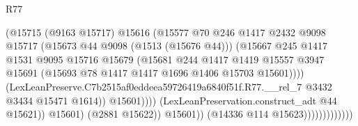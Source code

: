 \begin{lexlean}{R77}
\begin{coremodule}
{{                                              (@15715
                                                (@9163 @15717)
                                                @15616
                                                (@15577
                                                  @70
                                                  @246
                                                  @1417
                                                  @2432
                                                  @9098
                                                  @15717
                                                  (@15673 @44 @9098 (@1513 (@15676 @44)))
                                                  (@15667
                                                    @245
                                                    @1417
                                                    @1531
                                                    @9095
                                                    @15716
                                                    @15679
                                                    (@15681
                                                      @244
                                                      @1417
                                                      @1419
                                                      @15557
                                                      @3947
                                                      @15691
                                                      (@15693
                                                        @78
                                                        @1417
                                                        @1417
                                                        @1696
                                                        @1406
                                                        @15703
                                                        @15601))))
                                                (LexLeanPreserve.C7b2515af0eddeea59726419a6840f51f.R77.__rel_7
                                                  @3432
                                                  @3434
                                                  @15471
                                                  @1614))
                                              @15601))))
                                      (LexLeanPreservation.construct_adt @44 @15621))
                                    @15601)
                                  (@2881 @15622))
                                @15601))
                            (@14336 @114 @15623)))))))))))))
}}
\end{coremodule}
\end{lexlean}
